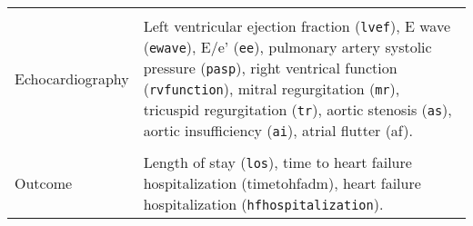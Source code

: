 \begin{longtable}{p{}  p{}}
&\\
Echocardiography & Left ventricular ejection fraction (\texttt{lvef}), E wave (\texttt{ewave}), E/e’ (\texttt{ee}), pulmonary artery systolic pressure (\texttt{pasp}), right ventrical function (\texttt{rvfunction}), mitral regurgitation (\texttt{mr}), tricuspid regurgitation (\texttt{tr}), aortic stenosis (\texttt{as}), aortic insufficiency (\texttt{ai}), atrial flutter (af).\\
&\\
Outcome & Length of stay (\texttt{los}), time to heart failure hospitalization (timetohfadm), heart failure hospitalization (\texttt{hfhospitalization}).\\
\midrule
\end{longtable}